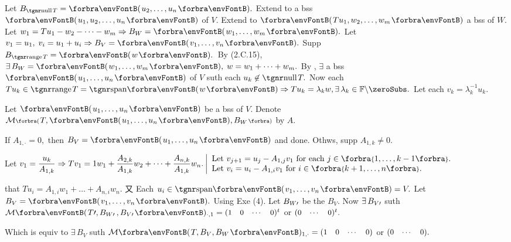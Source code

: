 Let $B_{\null T}=\Par{u_2,\dots,u_n}.$ Extend to a bss $\Par{u_1,u_2,\dots,u_n}$ of $V.$\parSol{}
Extend to $\Par{Tu_1,w_2,\dots,w_m}$ a bss of $W.$ Let $w_1=Tu_1-w_2-\dots-w_m\Rightarrow B_W=\Par{w_1,\dots,w_m}.$\parSol{}
Let \,$v_1=u_1,\;v_i=u_1+u_i\Rightarrow B_V=\Par{v_1,\dots,v_n}.$\PfEnd\vspace{3pt}\parSol{}
\Or Supp $B_{\range T}=\Par{w}.$ \,By {\NOTEFOR} (2.C.15), $\exists\,B_W=\Par{w_1,\dots,w_m},\;w=w_1+\dots+w_m.$\parSol{}
By , $\exists$ a bss $\Par{u_1,\dots,u_n}$ of $V$ suth each $u_k\not\in\null T.$\parSol{}
Now each $Tu_k\in\range T=\Span{w}\Rightarrow Tu_k=\lambda_k w,\exists\,\lambda_k\in\nonzeroFbb.$ Let each $v_k=\lambda_k^{-1}u_k.$\PfEnd
\SepLine

\par\quad
Let $\Par{u_1,\dots,u_n}$ be a bss of $V$. Denote $\Mt[\BigPar]{T,\Par{u_1,\dots,u_n},B_W}$ by $A.$\par\quad
If $A_{1,\cdot}=0,$ then $B_V=\Par{u_1,\dots,u_n}$ and done. Othws, supp $A_{1,k}\neq 0.$\par\quad
Let $v_1={\displaystyle{\frac{u_k}{A_{1,k}}}}\Rightarrow Tv_1=1w_1+{\displaystyle{\frac{A_{2,k}}{A_{1,k}}}}w_2+\dots+{\displaystyle{\frac{A_{n,k}}{A_{1,k}}}}w_n.$\;$\MathLeftMid{l}{$
	\!\!Let $v_{j+1}=u_{j}-A_{1,j}v_1$ for each $j\in\Bra{1,\dots,k-1}.\\$
	\!\!Let $v_i=u_i-A_{1,i} v_1$ for $i\in\Bra{k+1,\dots,n}.}$\vspace{4pt}\par\quad
\NOTICE that $Tu_i=A_{1,i}w_1+\dots+A_{n,i}w_n.$ 又 Each $u_i\in\Span{v_1,\dots,v_n}=V.$ Let $B_V=\Par{v_1,\dots,v_n}.$\PfEnd\vspace{4pt}\quad
\Or Using Exe (4). Let $B_{W\prime}$ be the $B_V.$ Now $\exists\,B_{V\prime}$ suth $\Mt{T\apostrophe,B_{W\apostrophe}\,,B_{V\apostrophe}}{_{\cdot,1}}={\small\begin{pmatrix}1&0&\cdots&0\end{pmatrix}}{^t}$ or ${\small\begin{pmatrix}0&\cdots&0\end{pmatrix}}{^t}.$\par\quad
Which is equiv to $\exists\,B_V$  suth $\Mt{T,B_V,B_W}{_{1,\cdot}}={\small\begin{pmatrix}1&0&\cdots&0\end{pmatrix}}$ or ${\small\begin{pmatrix}0&\cdots&0\end{pmatrix}}.$\PfEnd
\SepLine

